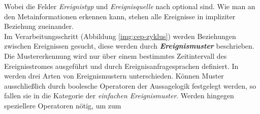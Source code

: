 \documentclass{acm_proc_article-sp}
\begin{document}
\begin{table}[ht]
    \caption{Ereignisaufbau}
    \label{table:ereignis}\vspace{0.2cm}
\end{table}
Wobei die Felder \textit{Ereignistyp} und \textit{Ereignisquelle} nach \cite{bruns} 
optional sind. Wie man an den Metainformationen erkennen kann, stehen alle Ereignisse in 
impliziter Beziehung zueinander.\\
Im Verarbeitungsschritt (Abbildung \ref{img:cep-zyklus}) werden Beziehungen zwischen 
Ereignissen gesucht, diese werden durch \textbf{\textit{Ereignismuster}} beschrieben. Die 
Mustererkennung wird nur über einem bestimmtes Zeitintervall des Ereignisstromes 
ausgeführt und durch Ereignisanfragesprachen definiert. In \cite{bruns} werden drei Arten 
von Ereignismustern unterschieden. Können Muster ausschließlich durch boolesche 
Operatoren der Aussagelogik festgelegt werden, so fallen sie in die Kategorie der 
\textit{einfachen Ereignismuster}. Werden hingegen speziellere Operatoren nötig, um zum 
\end{document}
